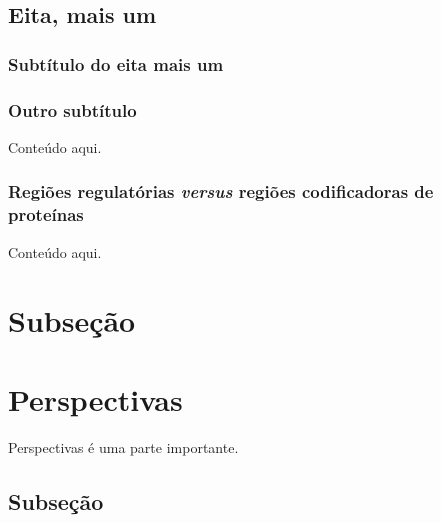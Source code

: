 \begin{refsection}
\subsection{Eita, mais um}
\subsubsection{Subtítulo do eita mais um}

\subsubsection{Outro subtítulo}

Conteúdo aqui.
\subsubsection{Regiões regulatórias \emph{versus} regiões codificadoras de proteínas}
Conteúdo aqui.

\section{Subseção}

%
%
%
\newpage
\section{Perspectivas}

Perspectivas é uma parte importante.
\subsection{Subseção}


\end{refsection}
